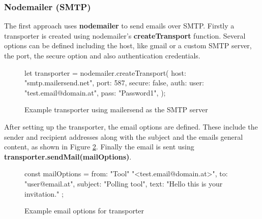 \documentclass[a4paper,12pt]{report}
\begin{document}
\subsubsection{Nodemailer (SMTP)}
The first approach uses \textbf{nodemailer} to send emails over SMTP. Firstly a transporter is created using nodemailer's \textbf{createTransport} function. Several options can be defined including the host, like gmail or a custom SMTP server, the port, the secure option and also authentication credentials. 
\begin{figure}[H]
	\begin{code}
		let transporter = nodemailer.createTransport({
			host: "smtp.mailersend.net",
			port: 587,
			secure: false,
			auth: {
				user: "test.email@domain.at",
				pass: "Password1",
			}
		});
	\end{code}
	\caption{Example transporter using mailersend as the SMTP server}
	\label{fig:example-transporter}
\end{figure}
\noindent
After setting up the transporter, the email options are defined. These include the sender and recipient addresses along with the subject and the emails general content, as shown in Figure \ref{fig:example-mail-options-smtp}. Finally the email is sent using \textbf{transporter.sendMail(mailOptions)}.
\begin{figure}[H]
	\begin{code}
		const mailOptions = {
			from: "Tool" "<test.email@domain.at>",
			to: "user@email.at",
			subject: "Polling tool",
			text: "Hello this is your invitation."
		};
	\end{code}
	\caption{Example email options for transporter}
	\label{fig:example-mail-options-smtp}
\end{figure}
\end{document}
